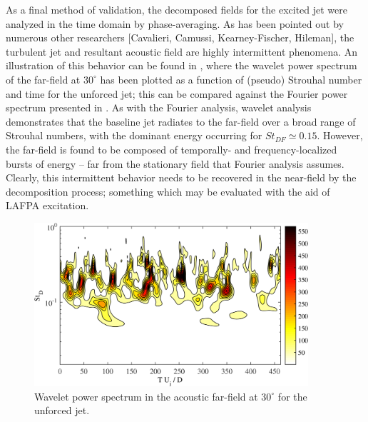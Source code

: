 As a final method of validation, the decomposed fields for the excited jet were analyzed in the time domain by phase-averaging.
As has been pointed out by numerous other researchers [Cavalieri, Camussi, Kearney-Fischer, Hileman], the turbulent jet and resultant acoustic field are highly intermittent phenomena. 
An illustration of this behavior can be found in , where the wavelet power spectrum of the far-field at $30^\circ$ has been plotted as a function of (pseudo) Strouhal number and time for the unforced jet; this can be compared against the Fourier power spectrum presented in . 
As with the Fourier analysis, wavelet analysis demonstrates that the baseline jet radiates to the far-field over a broad range of Strouhal numbers, with the dominant energy occurring for $St_{DF} \simeq 0.15$. 
However, the far-field is found to be composed of temporally- and frequency-localized bursts of energy – far from the stationary field that Fourier analysis assumes. 
Clearly, this intermittent behavior needs to be recovered in the near-field by the decomposition process; something which may be evaluated with the aid of LAFPA excitation.
\begin{figure}
	\centering
	\includegraphics[width=4in]{Figures/ch3_wavelet_spectrum.png}
	\caption{Wavelet power spectrum in the acoustic far-field at $30^\circ$ for the unforced jet.}
	\label{fig:ch3_wavelet_spectrum}
\end{figure}

